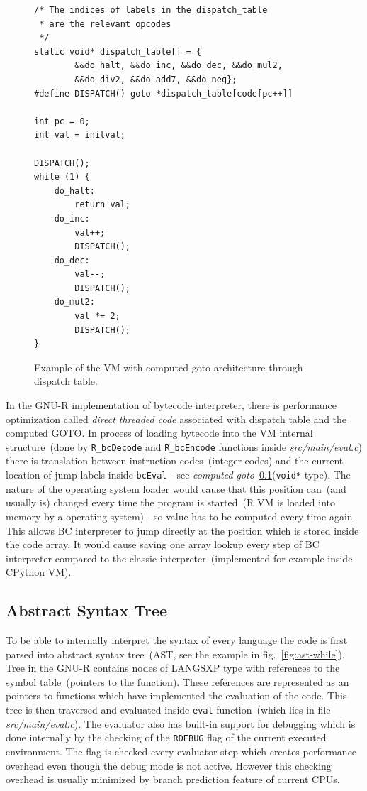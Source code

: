 \documentclass[thesis=M,english]{FITthesis}[2018/10/20]
\newcommand{\code}[1]{\texttt{#1}}
\begin{document}
\begin{figure}[H]
\begin{lstlisting}
/* The indices of labels in the dispatch_table
 * are the relevant opcodes
 */
static void* dispatch_table[] = {
        &&do_halt, &&do_inc, &&do_dec, &&do_mul2,
        &&do_div2, &&do_add7, &&do_neg};
#define DISPATCH() goto *dispatch_table[code[pc++]]

int pc = 0;
int val = initval;

DISPATCH();
while (1) {
    do_halt:
        return val;
    do_inc:
        val++;
        DISPATCH();
    do_dec:
        val--;
        DISPATCH();
    do_mul2:
        val *= 2;
        DISPATCH();
}
\end{lstlisting}
\caption{\label{fig:goto-used-table} Example of the VM with computed goto architecture through dispatch table.}
\end{figure}

In the GNU-R implementation of bytecode interpreter, there is performance optimization called \textit{direct threaded code} associated with dispatch table and the computed GOTO. In process of loading bytecode into the VM internal structure~(done by \code{R{\_}bcDecode} and \code{R{\_}bcEncode} functions inside \textit{src/main/eval.c}) there is translation between instruction codes~(integer codes) and the current location of jump labels inside \code{bcEval} - see \textit{computed goto}~\ref{AST}(\code{void*} type). The nature of the operating system loader would cause that this position can~(and usually is) changed every time the program is started~(R VM is loaded into memory by a operating system) - so value has to be computed every time again. This allows BC interpreter to jump directly at the position which is stored inside the code array. It would cause saving one array lookup every step of BC interpreter compared to the classic interpreter~(implemented for example inside CPython VM).

\subsection{Abstract Syntax Tree}\label{AST}

To be able to internally interpret the syntax of every language the code is first parsed into abstract syntax tree~(AST, see the example in fig.~\ref{fig:ast-while}). Tree in the GNU-R contains nodes of LANGSXP type with references to the symbol table~(pointers to the function). These references are represented as an pointers to functions which have implemented the evaluation of the code. This tree is then traversed and evaluated inside \code{eval} function~(which lies in file \textit{src/main/eval.c}). The evaluator also has built-in support for debugging which is done internally by the checking of the \code{RDEBUG} flag of the current executed environment. The flag is checked every evaluator step which creates performance overhead even though the debug mode is not active. However this checking overhead is usually minimized by branch prediction feature of current CPUs. 
\end{document}
